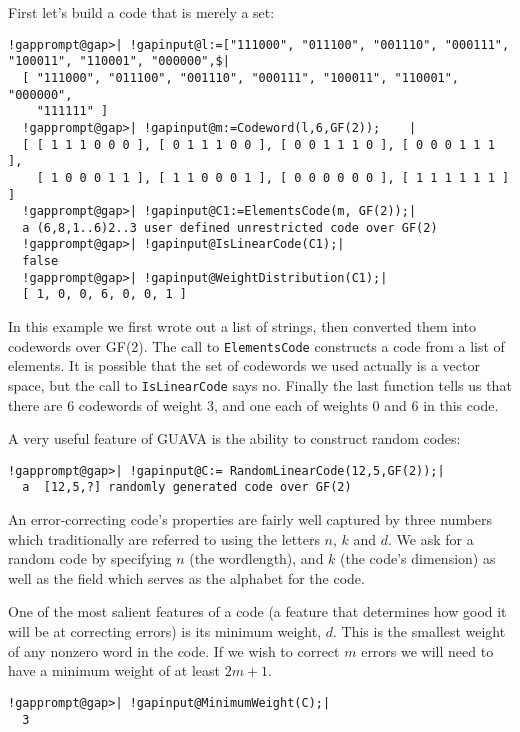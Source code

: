 \documentclass[a4paper,11pt]{report}
\begin{document}
{{ First let's build a code that is merely a set: 
\begin{Verbatim}[commandchars=!@|,fontsize=\small,frame=single,label=Example]
  !gapprompt@gap>| !gapinput@l:=["111000", "011100", "001110", "000111", "100011", "110001", "000000",$|
  [ "111000", "011100", "001110", "000111", "100011", "110001", "000000", 
    "111111" ]
  !gapprompt@gap>| !gapinput@m:=Codeword(l,6,GF(2));    |
  [ [ 1 1 1 0 0 0 ], [ 0 1 1 1 0 0 ], [ 0 0 1 1 1 0 ], [ 0 0 0 1 1 1 ], 
    [ 1 0 0 0 1 1 ], [ 1 1 0 0 0 1 ], [ 0 0 0 0 0 0 ], [ 1 1 1 1 1 1 ] ]
  !gapprompt@gap>| !gapinput@C1:=ElementsCode(m, GF(2));|
  a (6,8,1..6)2..3 user defined unrestricted code over GF(2)
  !gapprompt@gap>| !gapinput@IsLinearCode(C1);|
  false
  !gapprompt@gap>| !gapinput@WeightDistribution(C1);|
  [ 1, 0, 0, 6, 0, 0, 1 ]
\end{Verbatim}
 

 In this example we first wrote out a list of strings, then converted them into
codewords over GF(2). The call to \texttt{ElementsCode} constructs a code from a list of elements. It is possible that the set of
codewords we used actually is a vector space, but the call to \texttt{IsLinearCode} says no. Finally the last function tells us that there are 6 codewords of
weight 3, and one each of weights 0 and 6 in this code. 

 A very useful feature of \textsf{GUAVA} is the ability to construct random codes: 
\begin{Verbatim}[commandchars=!@|,fontsize=\small,frame=single,label=Example]
  !gapprompt@gap>| !gapinput@C:= RandomLinearCode(12,5,GF(2));|
  a  [12,5,?] randomly generated code over GF(2)
\end{Verbatim}
 

 An error-correcting code's properties are fairly well captured by three
numbers which traditionally are referred to using the letters $n$, $k$ and $d$. We ask for a random code by specifying $n$ (the wordlength), and $k$ (the code's dimension) as well as the field which serves as the alphabet for
the code. 

 One of the most salient features of a code (a feature that determines how good
it will be at correcting errors) is its minimum weight, $d$. This is the smallest weight of any nonzero word in the code. If we wish to
correct $m$ errors we will need to have a minimum weight of at least $2m+1$. 
\begin{Verbatim}[commandchars=!@|,fontsize=\small,frame=single,label=Example]
  !gapprompt@gap>| !gapinput@MinimumWeight(C);|
  3
\end{Verbatim}
 

}}
\end{document}

